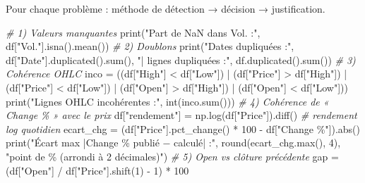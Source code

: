 \documentclass[
  10pt,
]{article}
\newenvironment{Shaded}{}{}
\newcommand{\BuiltInTok}[1]{\textcolor[rgb]{0.00,0.50,0.00}{#1}}
\newcommand{\CommentTok}[1]{\textcolor[rgb]{0.38,0.63,0.69}{\textit{#1}}}
\newcommand{\DecValTok}[1]{\textcolor[rgb]{0.25,0.63,0.44}{#1}}
\newcommand{\NormalTok}[1]{#1}
\newcommand{\OperatorTok}[1]{\textcolor[rgb]{0.40,0.40,0.40}{#1}}
\newcommand{\StringTok}[1]{\textcolor[rgb]{0.25,0.44,0.63}{#1}}
\begin{document}
Pour chaque problème : méthode de détection → décision → justification.

\begin{Shaded}
\begin{Highlighting}[]
\CommentTok{\# 1) Valeurs manquantes}
\BuiltInTok{print}\NormalTok{(}\StringTok{"Part de NaN dans Vol. :"}\NormalTok{, df[}\StringTok{"Vol."}\NormalTok{].isna().mean())}
\CommentTok{\# 2) Doublons}
\BuiltInTok{print}\NormalTok{(}\StringTok{"Dates dupliquées :"}\NormalTok{, df[}\StringTok{"Date"}\NormalTok{].duplicated().}\BuiltInTok{sum}\NormalTok{(), }\StringTok{"| lignes dupliquées :"}\NormalTok{, df.duplicated().}\BuiltInTok{sum}\NormalTok{())}
\CommentTok{\# 3) Cohérence OHLC}
\NormalTok{inco }\OperatorTok{=}\NormalTok{ ((df[}\StringTok{"High"}\NormalTok{] }\OperatorTok{\textless{}}\NormalTok{ df[}\StringTok{"Low"}\NormalTok{]) }\OperatorTok{|}\NormalTok{ (df[}\StringTok{"Price"}\NormalTok{] }\OperatorTok{\textgreater{}}\NormalTok{ df[}\StringTok{"High"}\NormalTok{]) }\OperatorTok{|}\NormalTok{ (df[}\StringTok{"Price"}\NormalTok{] }\OperatorTok{\textless{}}\NormalTok{ df[}\StringTok{"Low"}\NormalTok{]) }\OperatorTok{|}
\NormalTok{        (df[}\StringTok{"Open"}\NormalTok{] }\OperatorTok{\textgreater{}}\NormalTok{ df[}\StringTok{"High"}\NormalTok{]) }\OperatorTok{|}\NormalTok{ (df[}\StringTok{"Open"}\NormalTok{] }\OperatorTok{\textless{}}\NormalTok{ df[}\StringTok{"Low"}\NormalTok{]))}
\BuiltInTok{print}\NormalTok{(}\StringTok{"Lignes OHLC incohérentes :"}\NormalTok{, }\BuiltInTok{int}\NormalTok{(inco.}\BuiltInTok{sum}\NormalTok{()))}
\CommentTok{\# 4) Cohérence de « Change \% » avec le prix}
\NormalTok{df[}\StringTok{"rendement"}\NormalTok{] }\OperatorTok{=}\NormalTok{ np.log(df[}\StringTok{"Price"}\NormalTok{]).diff()                 }\CommentTok{\# rendement log quotidien}
\NormalTok{ecart\_chg }\OperatorTok{=}\NormalTok{ (df[}\StringTok{"Price"}\NormalTok{].pct\_change() }\OperatorTok{*} \DecValTok{100} \OperatorTok{{-}}\NormalTok{ df[}\StringTok{"Change \%"}\NormalTok{]).}\BuiltInTok{abs}\NormalTok{()}
\BuiltInTok{print}\NormalTok{(}\StringTok{"Écart max |Change \% publié − calculé| :"}\NormalTok{, }\BuiltInTok{round}\NormalTok{(ecart\_chg.}\BuiltInTok{max}\NormalTok{(), }\DecValTok{4}\NormalTok{), }\StringTok{"point de \%  (arrondi à 2 décimales)"}\NormalTok{)}
\CommentTok{\# 5) Open vs clôture précédente}
\NormalTok{gap }\OperatorTok{=}\NormalTok{ (df[}\StringTok{"Open"}\NormalTok{] }\OperatorTok{/}\NormalTok{ df[}\StringTok{"Price"}\NormalTok{].shift(}\DecValTok{1}\NormalTok{) }\OperatorTok{{-}} \DecValTok{1}\NormalTok{) }\OperatorTok{*} \DecValTok{100}

\end{Highlighting}
\end{Shaded}
\end{document}
